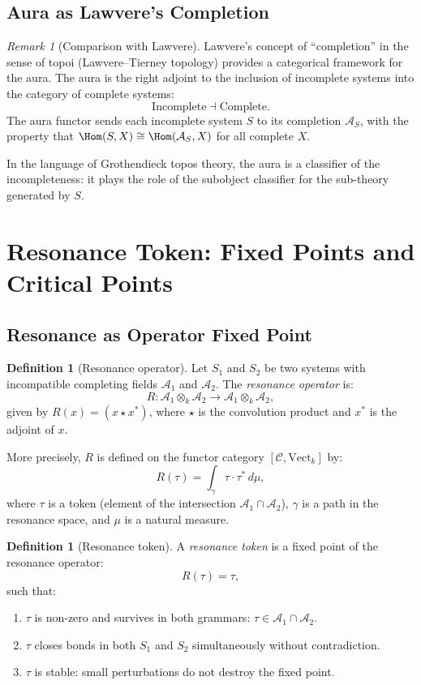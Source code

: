 \documentclass[12pt]{article}
\theoremstyle{definition}
\newtheorem{definition}[theorem]{Definition}
\theoremstyle{remark}
\newtheorem{remark}[theorem]{Remark}
\newcommand{\cC}{\mathcal{C}}
\begin{document}
\subsection{Aura as Lawvere's Completion}

\begin{remark}[Comparison with Lawvere]
Lawvere's concept of ``completion'' in the sense of topoi (Lawvere--Tierney topology) provides a categorical framework for the aura. The aura is the right adjoint to the inclusion of incomplete systems into the category of complete systems:
\[
\text{Incomplete} \dashv \text{Complete}.
\]
The aura functor sends each incomplete system $S$ to its completion $\mathcal{A}_S$, with the property that $\Hom(S, X) \cong \Hom(\mathcal{A}_S, X)$ for all complete $X$.

In the language of Grothendieck topos theory, the aura is a classifier of the incompleteness: it plays the role of the subobject classifier for the sub-theory generated by $S$.
\end{remark}

\section{Resonance Token: Fixed Points and Critical Points}

\subsection{Resonance as Operator Fixed Point}

\begin{definition}[Resonance operator]
Let $S_1$ and $S_2$ be two systems with incompatible completing fields $\mathcal{A}_1$ and $\mathcal{A}_2$. The \emph{resonance operator} is:
\[
R : \mathcal{A}_1 \otimes_k \mathcal{A}_2 \to \mathcal{A}_1 \otimes_k \mathcal{A}_2,
\]
given by $R(x) = (x \star x^*)$, where $\star$ is the convolution product and $x^*$ is the adjoint of $x$.

More precisely, $R$ is defined on the functor category $[\cC, \mathrm{Vect}_k]$ by:
\[
R(\tau) = \int_{\gamma} \tau \cdot \tau^* \, d\mu,
\]
where $\tau$ is a token (element of the intersection $\mathcal{A}_1 \cap \mathcal{A}_2$), $\gamma$ is a path in the resonance space, and $\mu$ is a natural measure.
\end{definition}

\begin{definition}[Resonance token]
A \emph{resonance token} is a fixed point of the resonance operator:
\[
R(\tau) = \tau,
\]
such that:
\begin{enumerate}
\item $\tau$ is non-zero and survives in both grammars: $\tau \in \mathcal{A}_1 \cap \mathcal{A}_2$.
\item $\tau$ closes bonds in both $S_1$ and $S_2$ simultaneously without contradiction.
\item $\tau$ is stable: small perturbations do not destroy the fixed point.
\end{enumerate}
\end{definition}
\end{document}

